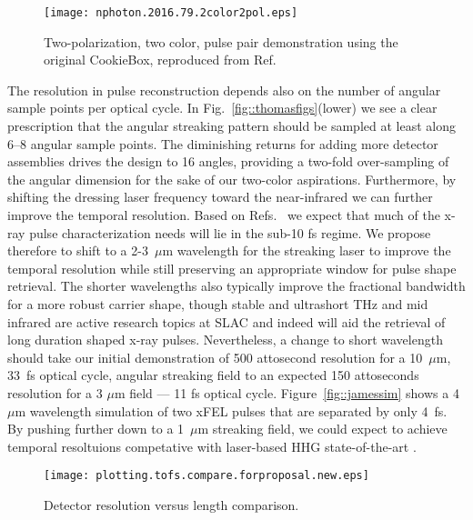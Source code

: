 \begin{wrapfigure}[16]{l}{3in}
\centerline{\texttt{[image: nphoton.2016.79.2color2pol.eps]}}
\caption{\label{fig::2color2polResults}Two-polarization, two color, pulse pair demonstration using the original CookieBox, reproduced from Ref.~\cite{Lutman2016}}
\end{wrapfigure}
The resolution in pulse reconstruction depends also on the number of angular sample points per optical cycle.
In Fig.~\ref{fig::thomasfigs}(lower) we see a clear prescription that the angular streaking pattern should be sampled at least along 6--8 angular sample points.
The diminishing returns for adding more detector assemblies drives the design to 16 angles, providing a two-fold over-sampling of the angular dimension for the sake of our two-color aspirations.
Furthermore, by shifting the dressing laser frequency toward the near-infrared we can further improve the temporal resolution.
Based on Refs.~\cite{lcls2_opportunities,Cederbaum2008,Biggs2012,Mukamel2013} we expect that much of the x-ray pulse characterization needs will lie in the sub-10 fs regime.
We propose therefore to shift to a 2-3~$\mu$m wavelength for the streaking laser to improve the temporal resolution while still preserving an appropriate window for pulse shape retrieval.
The shorter wavelengths also typically improve the fractional bandwidth for a more robust carrier shape, though stable and ultrashort THz \cite{Matthias2008,MatthiasReview2011,Hauri2011} and mid infrared \cite{Sell2008,Cavalleri2010} are active research topics at SLAC and indeed will aid the retrieval of long duration shaped x-ray pulses. 
Nevertheless, a change to short wavelength should take our initial demonstration of 500 attosecond resolution for a 10~$\mu$m, 33~fs optical cycle, angular streaking field to an expected 150 attoseconds resolution for a 3 $\mu$m field --- 11 fs optical cycle.
Figure~\ref{fig::jamessim} shows a 4~$\mu$m wavelength simulation of two xFEL pulses that are separated by only 4~fs.
By pushing further down to a 1~$\mu$m streaking field, we could expect to achieve temporal resoltuions competative with laser-based HHG state-of-the-art \cite{Zenghu2017,HJWorner2017}.

\begin{wrapfigure}[16]{r}{3.5in}
\vspace{-1.5\baselineskip}
\centerline{\texttt{[image: plotting.tofs.compare.forproposal.new.eps]}}
\vspace{-0.5\baselineskip}
\caption{\label{fig::detectorcompare}Detector resolution versus length comparison. }
\end{wrapfigure}

